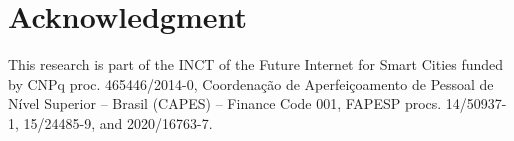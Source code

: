 \documentclass[conference]{IEEEtran}
\begin{document}










\section*{Acknowledgment}
This research is part of the INCT of the Future Internet for Smart Cities funded by CNPq proc. 465446/2014-0, Coordenação de Aperfeiçoamento de Pessoal de Nível Superior – Brasil (CAPES) – Finance Code 001, FAPESP procs. 14/50937-1, 15/24485-9, and 2020/16763-7.

\begin{small}
    
    
\end{small}

\end{document}
